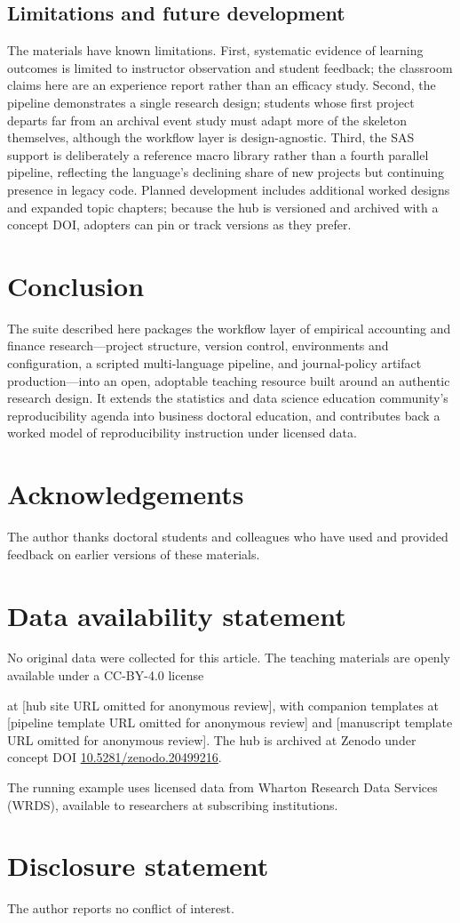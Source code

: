 \documentclass[12pt]{article}
\newif\ifanon
\newcommand{\hubsite}{[hub site URL omitted for anonymous review]}
\newcommand{\pipelinerepo}{[pipeline template URL omitted for anonymous review]}
\newcommand{\manuscriptrepo}{[manuscript template URL omitted for anonymous review]}
\newcommand{\hubsite}{\url{https://eweisbrod.github.io/example-project/}}
\newcommand{\pipelinerepo}{\url{https://github.com/eweisbrod/project-template}}
\newcommand{\manuscriptrepo}{\url{https://github.com/eweisbrod/overleaf-template}}
\begin{document}
\subsection{Limitations and future development}

The materials have known limitations. First, systematic evidence of
learning outcomes is limited to instructor observation and student
feedback; the classroom claims here are an experience report rather than
an efficacy study. Second, the pipeline demonstrates a single research
design; students whose first project departs far from an archival event
study must adapt more of the skeleton themselves, although the workflow
layer is design-agnostic. Third, the SAS support is deliberately a
reference macro library rather than a fourth parallel pipeline,
reflecting the language's declining share of new projects but continuing
presence in legacy code. Planned development includes additional worked
designs and expanded topic chapters; because the hub is versioned and
archived with a concept DOI, adopters can pin or track versions as they
prefer.

\section{Conclusion}

The suite described here packages the workflow layer of empirical
accounting and finance research---project structure, version control,
environments and configuration, a scripted multi-language pipeline, and
journal-policy artifact production---into an open, adoptable teaching
resource built around an authentic research design. It extends the
statistics and data science education community's reproducibility agenda
into business doctoral education, and contributes back a worked model of
reproducibility instruction under licensed data.

\ifanon
\else
\section*{Acknowledgements}

The author thanks doctoral students and colleagues who have used and
provided feedback on earlier versions of these materials.
\fi

\section*{Data availability statement}

No original data were collected for this article. The teaching materials
are openly available under a CC-BY-4.0 license
\ifanon
at repositories whose URLs are withheld for anonymous review and will be
supplied to the editors on request; the hub is archived with a citable
concept DOI.
\else
at \hubsite, with companion templates at \pipelinerepo{} and
\manuscriptrepo. The hub is archived at Zenodo under concept DOI
\href{https://doi.org/10.5281/zenodo.20499216}{10.5281/zenodo.20499216}.
\fi
The running example uses licensed data from Wharton Research Data
Services (WRDS), available to researchers at subscribing institutions.

\section*{Disclosure statement}

The author reports no conflict of interest.

\newpage

\end{document}
